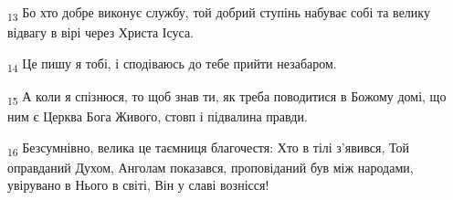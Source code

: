 \begin{tcolorbox}
\textsubscript{13} Бо хто добре виконує службу, той добрий ступінь набуває собі та велику відвагу в вірі через Христа Ісуса.
\end{tcolorbox}
\begin{tcolorbox}
\textsubscript{14} Це пишу я тобі, і сподіваюсь до тебе прийти незабаром.
\end{tcolorbox}
\begin{tcolorbox}
\textsubscript{15} А коли я спізнюся, то щоб знав ти, як треба поводитися в Божому домі, що ним є Церква Бога Живого, стовп і підвалина правди.
\end{tcolorbox}
\begin{tcolorbox}
\textsubscript{16} Безсумнівно, велика це таємниця благочестя: Хто в тілі з'явився, Той оправданий Духом, Анголам показався, проповіданий був між народами, увірувано в Нього в світі, Він у славі вознісся!
\end{tcolorbox}
